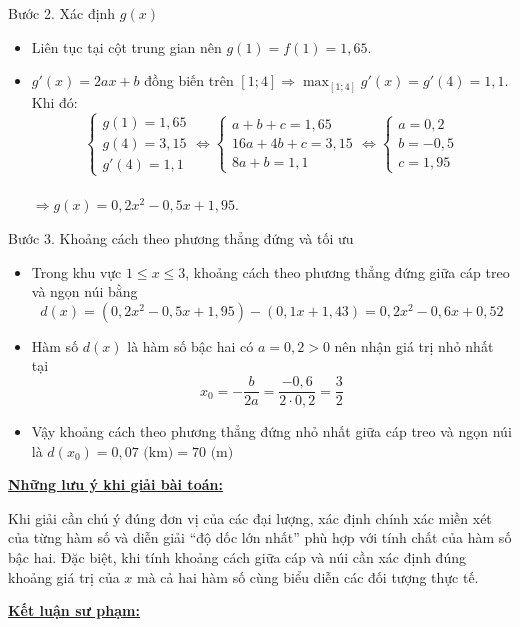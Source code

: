 \documentclass[12pt,a4paper,oneside]{book}
\theoremstyle{theorem}
\theoremstyle{definition}
\begin{document}
Bước 2. Xác định $g(x)$
\begin{itemize}
    \item Liên tục tại cột trung gian nên $g(1) = f(1) = 1,65$.
    \item $g'(x) = 2ax + b$ đồng biến trên $[1; 4] \Rightarrow \max_{[1; 4]} g'(x) = g'(4) = 1,1$. Khi đó:
    $$\begin{cases} g(1) = 1,65 \\ g(4) = 3,15 \\ g'(4) = 1,1 \end{cases} \Leftrightarrow \begin{cases} a + b + c = 1,65 \\ 16a + 4b + c = 3,15 \\ 8a + b = 1,1 \end{cases} \Leftrightarrow \begin{cases} a = 0,2 \\ b = -0,5 \\ c = 1,95 \end{cases}$$\\
    $\Rightarrow g(x) = 0,2x^2 - 0,5x + 1,95.$
\end{itemize}

Bước 3. Khoảng cách theo phương thẳng đứng và tối ưu
\begin{itemize}
    \item Trong khu vực $1 \le x \le 3$, khoảng cách theo phương thẳng đứng giữa cáp treo và ngọn núi bằng
    $$d(x) = (0,2x^2 - 0,5x + 1,95) - (0,1x + 1,43) = 0,2x^2 - 0,6x + 0,52$$
    \item Hàm số $d(x)$ là hàm số bậc hai có $a = 0,2 > 0$ nên nhận giá trị nhỏ nhất tại
    $$x_0 = -\dfrac{b}{2a} = \dfrac{-0,6}{2 \cdot 0,2} = \dfrac{3}{2}$$
    \item Vậy khoảng cách theo phương thẳng đứng nhỏ nhất giữa cáp treo và ngọn núi là $d(x_0) = 0,07 \text{ (km)} = 70 \text{ (m)}$
\end{itemize}
         
        \textbf{\underline{Những lưu ý khi giải bài toán:}}

        Khi giải cần chú ý đúng đơn vị của các đại lượng, xác định chính xác miền xét của từng hàm số và diễn giải “độ dốc lớn nhất” phù hợp với tính chất của hàm số bậc hai. Đặc biệt, khi tính khoảng cách giữa cáp và núi cần xác định đúng khoảng giá trị của \(x\) mà cả hai hàm số cùng biểu diễn các đối tượng thực tế.
        
        \textbf{\underline{Kết luận sư phạm:}}
\end{document}
